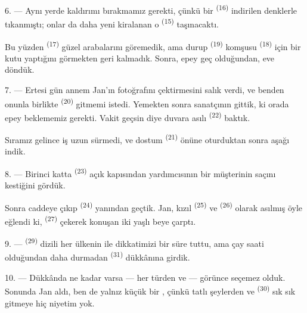 6. --- Aynı yerde kaldırımı bırakmamız gerekti, çünkü bir  \textsuperscript{(16)} indirilen denklerle tıkanmıştı; onlar da
daha yeni kiralanan o  \textsuperscript{(15)} taşınacaktı.

Bu yüzden  \textsuperscript{(17)} güzel arabalarını
göremedik, ama durup  \textsuperscript{(19)} komşusu
 \textsuperscript{(18)} için bir kutu
yaptığını görmekten geri kalmadık. Sonra, epey geç olduğundan, eve döndük.

\VUsaut{3.0mm}

7. --- Ertesi gün annem Jan'ın fotoğrafını çektirmesini salık verdi, ve benden
onunla birlikte  \textsuperscript{(20)} gitmemi istedi.
Yemekten sonra sanatçının  gittik, ki orada epey beklememiz
gerekti. Vakit geçsin diye duvara asılı 
\textsuperscript{(22)} baktık.

Sıramız gelince iş uzun sürmedi, ve dostum 
\textsuperscript{(21)} önüne oturduktan sonra aşağı indik.

8. --- Birinci katta  \textsuperscript{(23)} açık kapısından
yardımcısının bir müşterinin saçını kestiğini gördük.

Sonra caddeye çıkıp  \textsuperscript{(24)} yanından
geçtik. Jan, kızıl  \textsuperscript{(25)} ve
 \textsuperscript{(26)} olarak asılmış  öyle
eğlendi ki,  \textsuperscript{(27)} çekerek
konuşan iki yaşlı beye çarptı.

\VUsaut{3.0mm}

9. ---  \textsuperscript{(29)}  dizili her
ülkenin  ile  dikkatimizi bir
süre tuttu, ama çay saati olduğundan daha durmadan 
\textsuperscript{(31)} dükkânına girdik.

10. --- Dükkânda ne kadar  varsa --- her türden
 ve  --- görünce
seçemez olduk. Sonunda Jan  aldı, ben de yalnız küçük
bir , çünkü tatlı şeylerden  ve
 \textsuperscript{(30)} sık sık gitmeye hiç niyetim yok.

